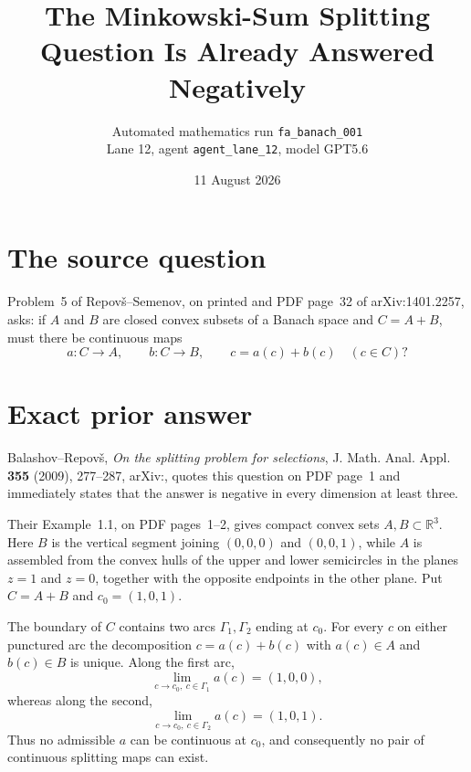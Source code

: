 \documentclass[10pt]{article}
\title{The Minkowski-Sum Splitting Question Is Already Answered Negatively}
\author{Automated mathematics run \texttt{fa\_banach\_001}\\
Lane 12, agent \texttt{agent\_lane\_12}, model GPT5.6}
\date{11 August 2026}
\begin{document}
\maketitle

\begin{center}
\end{center}

\section*{The source question}

Problem~5 of Repov\v{s}--Semenov, on printed and PDF page~32 of
arXiv:1401.2257, asks: if $A$ and $B$ are closed convex subsets of a Banach
space and $C=A+B$, must there be continuous maps
\[
 a:C\longrightarrow A,\qquad b:C\longrightarrow B,
 \qquad c=a(c)+b(c)\quad(c\in C)?
\]

\section*{Exact prior answer}

Balashov--Repov\v{s}, \emph{On the splitting problem for selections},
J. Math. Anal. Appl. \textbf{355} (2009), 277--287,
arXiv:, quotes this question on PDF page~1 and immediately states
that the answer is negative in every dimension at least three.

Their Example~1.1, on PDF pages~1--2, gives compact convex sets $A,B\subset
\mathbb R^3$.  Here $B$ is the vertical segment joining $(0,0,0)$ and
$(0,0,1)$, while $A$ is assembled from the convex hulls of the upper and
lower semicircles in the planes $z=1$ and $z=0$, together with the opposite
endpoints in the other plane. Put $C=A+B$ and $c_0=(1,0,1)$.

The boundary of $C$ contains two arcs $\Gamma_1,\Gamma_2$ ending at $c_0$.
For every $c$ on either punctured arc the decomposition
$c=a(c)+b(c)$ with $a(c)\in A$ and $b(c)\in B$ is unique.  Along the first arc,
\[
 \lim_{c\to c_0,\ c\in\Gamma_1}a(c)=(1,0,0),
\]
whereas along the second,
\[
 \lim_{c\to c_0,\ c\in\Gamma_2}a(c)=(1,0,1).
\]
Thus no admissible $a$ can be continuous at $c_0$, and consequently no pair
of continuous splitting maps can exist.
\end{document}
